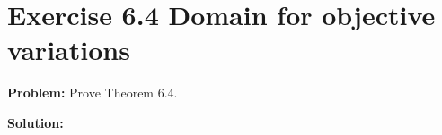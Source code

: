 \section{Exercise 6.4 Domain for objective variations}
\textbf{Problem:} Prove Theorem 6.4.

\textbf{Solution:} 
